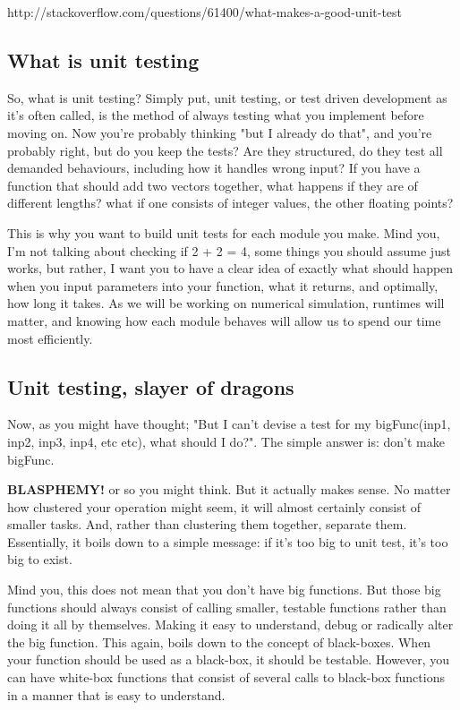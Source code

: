 \documentclass[10pt,a4paper]{article}
\begin{document}
http://stackoverflow.com/questions/61400/what-makes-a-good-unit-test
\subsection{What is unit testing}
So, what is unit testing? Simply put, unit testing, or test driven development as it's often called, is the method of always testing what you implement before moving on. Now you're probably thinking "but I already do that", and you're probably right, but do you keep the tests? Are they structured, do they test all demanded behaviours, including how it handles wrong input? If you have a function that should add two vectors together, what happens if they are of different lengths? what if one consists of integer values, the other floating points? 

This is why you want to build unit tests for each module you make. Mind you, I'm not talking about checking if 2 + 2 = 4, some things you should assume just works, but rather, I want you to have a clear idea of exactly what should happen when you input parameters into your function, what it returns, and optimally, how long it takes. As we will be working on numerical simulation, runtimes will matter, and knowing how each module behaves will allow us to spend our time most efficiently.

\subsection{Unit testing, slayer of dragons}
Now, as you might have thought; "But I can't devise a test for my bigFunc(inp1, inp2, inp3, inp4, etc etc), what should I do?". The simple answer is: don't make bigFunc.

\textbf{BLASPHEMY!} or so you might think. But it actually makes sense. No matter how clustered your operation might seem, it will almost certainly consist of smaller tasks. And, rather than clustering them together, separate them. Essentially, it boils down to a simple message: if it's too big to unit test, it's too big to exist.

Mind you, this does not mean that you don't have big functions. But those big functions should always consist of calling smaller, testable functions rather than doing it all by themselves. Making it easy to understand, debug or radically alter the big function. This again, boils down to the concept of black-boxes. When your function should be used as a black-box, it should be testable. However, you can have white-box functions that consist of several calls to black-box functions in a manner that is easy to understand. 
\end{document}
